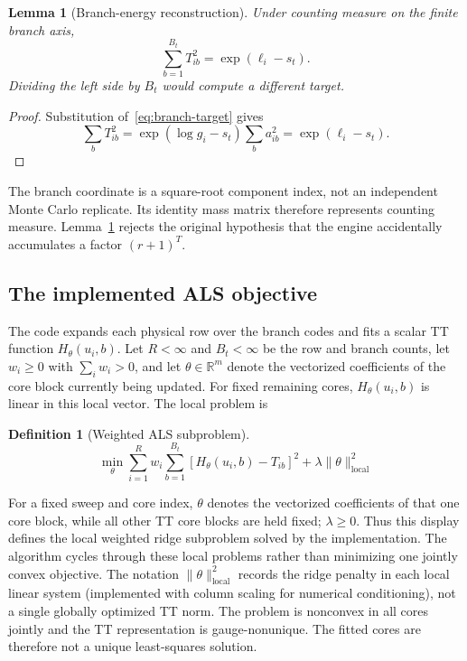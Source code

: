 \documentclass[11pt]{article}
\newtheorem{lemma}[proposition]{Lemma}
\newtheorem{definition}{Definition}
\begin{document}
\begin{lemma}[Branch-energy reconstruction]\label{lem:branch}
Under counting measure on the finite branch axis,
\begin{equation}\label{eq:branch-energy}
\sum_{b=1}^{B_t}T_{ib}^2=\exp(\ell_i-s_t).
\end{equation}
Dividing the left side by $B_t$ would compute a different target.
\end{lemma}

\begin{proof}
Substitution of~\eqref{eq:branch-target} gives
\[
\sum_bT_{ib}^2
=\exp(\log g_i-s_t)\sum_ba_{ib}^2
=\exp(\ell_i-s_t).
\]
\end{proof}

The branch coordinate is a square-root component index, not an independent
Monte Carlo replicate. Its identity mass matrix therefore represents counting
measure. Lemma~\ref{lem:branch} rejects the original hypothesis that the
engine accidentally accumulates a factor $(r+1)^T$.

\subsection{The implemented ALS objective}

The code expands each physical row over the branch codes and fits a scalar
TT function $H_\theta(u_i,b)$. Let $R<\infty$ and $B_t<\infty$ be the row and
branch counts, let $w_i\geq0$ with $\sum_iw_i>0$, and let $\theta\in\mathbb
R^m$ denote the vectorized coefficients of the core block currently being
updated. For fixed remaining cores, $H_\theta(u_i,b)$ is linear in this local
vector. The local problem is
\begin{definition}[Weighted ALS subproblem]
\begin{equation}\label{eq:als}
\min_\theta
\sum_{i=1}^{R}w_i\sum_{b=1}^{B_t}
\left[H_\theta(u_i,b)-T_{ib}\right]^2
+\lambda\|\theta\|_{\mathrm{local}}^2
\end{equation}
\end{definition}
For a fixed sweep and core index, $\theta$ denotes the vectorized coefficients
of that one core block, while all other TT core blocks are held fixed;
$\lambda\geq0$. Thus this display defines the local weighted ridge subproblem
solved by the implementation. The algorithm cycles through these local
problems rather than minimizing one jointly convex objective. The notation
$\|\theta\|_{\mathrm{local}}^2$ records the ridge penalty in each local linear
system (implemented with column scaling for numerical conditioning), not a
single globally optimized TT norm. The problem is nonconvex in all cores
jointly and the TT representation is gauge-nonunique. The fitted cores are
therefore not a unique least-squares solution.
\end{document}
